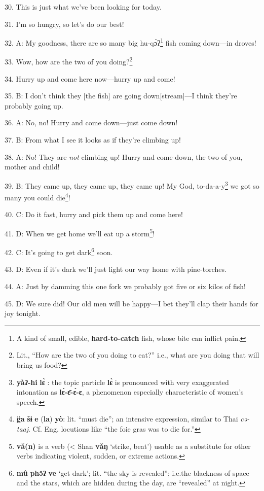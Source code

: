 30. This is just what we've been looking for today.

31. I'm so hungry, so let's do our best!

32. A: My goodness, there are so many big hu-qɔ̀ʔ\footnote{A kind of small, edible, \textbf{hard-to-catch} fish, whose bite can inflict pain.} fish coming down---in
droves!

33. Wow, how are the two of you doing?\footnote{Lit., ``How are the two of you doing to eat?'' i.e., what are you doing that will bring us food?}

34. Hurry up and come here now---hurry up and come!

35. B: I don't think they [the fish] are going down[stream]---I think they're probably
going up.

36. A: No, no! Hurry and come down---just come down!

37. B: From what I see it looks as if they're climbing up!

38. A: No! They are \textit{not} climbing up! Hurry and come down, the two of you,
mother and child!

39. B: They came up, they came up, they came up! My God, to-da-a-y\footnote{\textbf{yàʔ-hi} \textbf{lɛ̀} : the topic particle \textbf{lɛ̀} is pronounced with very exaggerated intonation as \textbf{lɛ̀-ɛ̄-ɛ́-ɛ}, a phenomenon especially characteristic of women's speech.} we got
so many you could die\footnote{\textbf{g̈a} \textbf{šɨ} \textbf{e} (\textbf{la}) \textbf{yò}: lit. ``must die''; an intensive expression, similar to Thai \textit{cə-taaj}. Cf. Eng. locutions like ``the foie gras was to die for.''}!

40. C: Do it fast, hurry and pick them up and come here!

41. D: When we get home we'll eat up a storm\footnote{\textbf{vǎ(n)} is a verb (< Shan \textbf{vǎŋ} `strike, beat') usable as a substitute for other verbs indicating violent, sudden, or extreme actions.}!

42. C: It's going to get dark\footnote{\textbf{mû} \textbf{phə̂ʔ} \textbf{ve} `get dark'; lit. ``the sky is revealed''; i.e.the blackness of space and the stars, which are hidden during the day, are ``revealed'' at night.} soon.

43. D: Even if it's dark we'll just light our way home with pine-torches.

44. A: Just by damming this one fork we probably got five or six kilos of fish!

45. D: We sure did! Our old men will be happy---I bet they'll clap their hands
for joy tonight.


